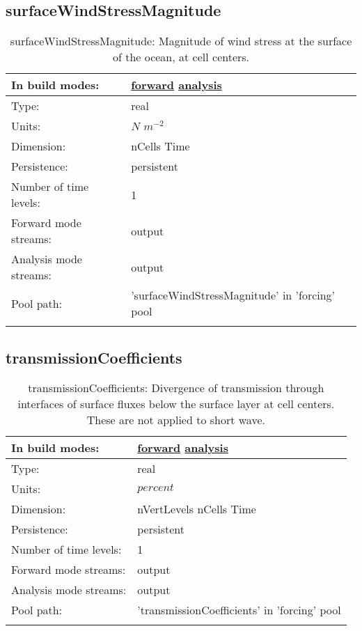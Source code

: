 \subsection[surfaceWindStressMagnitude]{surfaceWindStressMagnitude}
\label{subsec:var_sec_forcing_surfaceWindStressMagnitude}
\begin{center}
\begin{longtable}{| p{2.0in} | p{4.0in} |}
        \hline 
        In build modes: & \hyperref[subsec:forward_var_tab_forcing]{forward} \hyperref[subsec:analysis_var_tab_forcing]{analysis} \\
        \hline 
        Type: & real \\
        \hline 
        Units: & $N$ $m^{-2}$ \\
        \hline 
        Dimension: & nCells Time \\
        \hline 
        Persistence: & persistent \\
        \hline 
        Number of time levels: & 1 \\
        \hline 
		 Forward mode streams: &  output \\
        \hline 
		 Analysis mode streams: &  output \\
        \hline 
            Pool path: & 'surfaceWindStressMagnitude' in 'forcing' pool
 \\
		 \hline 
    \caption{surfaceWindStressMagnitude: Magnitude of wind stress at the surface of the ocean, at cell centers.}
\end{longtable}
\end{center}
\subsection[transmissionCoefficients]{transmissionCoefficients}
\label{subsec:var_sec_forcing_transmissionCoefficients}
\begin{center}
\begin{longtable}{| p{2.0in} | p{4.0in} |}
        \hline 
        In build modes: & \hyperref[subsec:forward_var_tab_forcing]{forward} \hyperref[subsec:analysis_var_tab_forcing]{analysis} \\
        \hline 
        Type: & real \\
        \hline 
        Units: & $percent$ \\
        \hline 
        Dimension: & nVertLevels nCells Time \\
        \hline 
        Persistence: & persistent \\
        \hline 
        Number of time levels: & 1 \\
        \hline 
		 Forward mode streams: &  output \\
        \hline 
		 Analysis mode streams: &  output \\
        \hline 
            Pool path: & 'transmissionCoefficients' in 'forcing' pool
 \\
		 \hline 
    \caption{transmissionCoefficients: Divergence of transmission through interfaces of surface fluxes below the surface layer at cell centers. These are not applied to short wave.}
\end{longtable}
\end{center}
